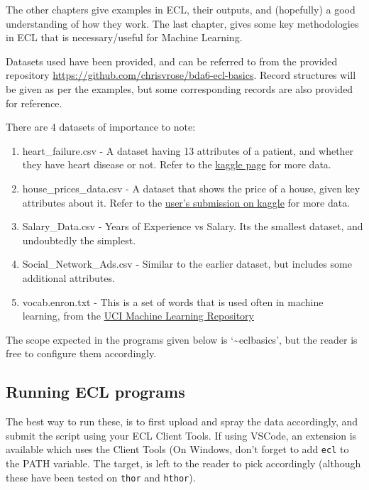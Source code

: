 The other chapters give examples in ECL, their outputs, and (hopefully) a good understanding of how they work. The last chapter, gives some key methodologies in ECL that is necessary/useful for Machine Learning.

Datasets used have been provided, and can be referred to from the provided repository \url{https://github.com/chrisvrose/bda6-ecl-basics}. Record structures will be given as per the examples, but some corresponding records are also provided for reference.

There are 4 datasets of importance to note:
\begin{enumerate}
    \item heart\_failure.csv - A dataset having 13 attributes of a patient, and whether they have heart disease or not. Refer to the \href{https://www.kaggle.com/ronitf/heart-disease-uci}{kaggle page} for more data. 
    \item house\_prices\_data.csv - A dataset that shows the price of a house, given key attributes about it. Refer to the \href{https://www.kaggle.com/shivachandel/kc-house-data}{user's submission on kaggle} for more data.
    \item Salary\_Data.csv - Years of Experience vs Salary. Its the smallest dataset, and undoubtedly the simplest.
    \item Social\_Network\_Ads.csv - Similar to the earlier dataset, but includes some additional attributes.
    \item vocab.enron.txt - This is a set of words that is used often in machine learning, from the \href{https://archive.ics.uci.edu/ml/datasets/Bag+of+Words}{UCI Machine Learning Repository}
\end{enumerate}

The scope expected in the programs given below is `\~{}eclbasics', but the reader is free to configure them accordingly.


\subsection{Running ECL programs}

The best way to run these, is to first upload and spray the data accordingly, and submit the script using your ECL Client Tools. If using VSCode, an extension is available which uses the Client Tools (On Windows, don't forget to add \lstinline{ecl} to the PATH variable. The target, is left to the reader to pick accordingly (although these have been tested on \lstinline{thor} and \lstinline{hthor}).

